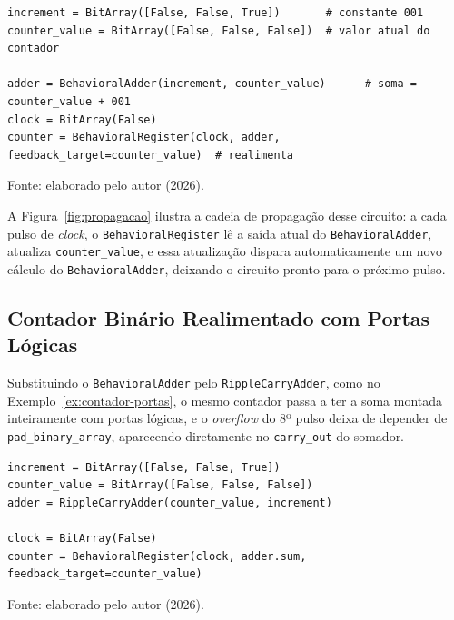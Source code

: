 \begin{exemplo}[H]
\caption{Contador binário de N \textit{bits} com BehavioralAdder.}
\label{ex:contador-behavioral}
\begin{verbatim}
increment = BitArray([False, False, True])       # constante 001
counter_value = BitArray([False, False, False])  # valor atual do contador

adder = BehavioralAdder(increment, counter_value)      # soma = counter_value + 001
clock = BitArray(False)
counter = BehavioralRegister(clock, adder, feedback_target=counter_value)  # realimenta
\end{verbatim}
\begin{center}
\footnotesize Fonte: elaborado pelo autor (2026).
\end{center}
\end{exemplo}

A Figura~\ref{fig:propagacao} ilustra a cadeia de propagação desse circuito: a cada pulso de \textit{clock}, o \texttt{BehavioralRegister} lê a saída atual do \texttt{BehavioralAdder}, atualiza \texttt{counter\_value}, e essa atualização dispara automaticamente um novo cálculo do \texttt{BehavioralAdder}, deixando o circuito pronto para o próximo pulso.

\subsection{Contador Binário Realimentado com Portas Lógicas}

Substituindo o \texttt{BehavioralAdder} pelo \texttt{RippleCarryAdder}, como no Exemplo~\ref{ex:contador-portas}, o mesmo contador passa a ter a soma montada inteiramente com portas lógicas, e o \textit{overflow} do 8º pulso deixa de depender de \texttt{pad\_binary\_array}, aparecendo diretamente no \texttt{carry\_out} do somador.

\begin{exemplo}[H]
\caption{Contador binário de N \textit{bits} com somador de portas lógicas.}
\label{ex:contador-portas}
\begin{verbatim}
increment = BitArray([False, False, True])
counter_value = BitArray([False, False, False])
adder = RippleCarryAdder(counter_value, increment)

clock = BitArray(False)
counter = BehavioralRegister(clock, adder.sum, feedback_target=counter_value)
\end{verbatim}
\begin{center}
\footnotesize Fonte: elaborado pelo autor (2026).
\end{center}
\end{exemplo}

